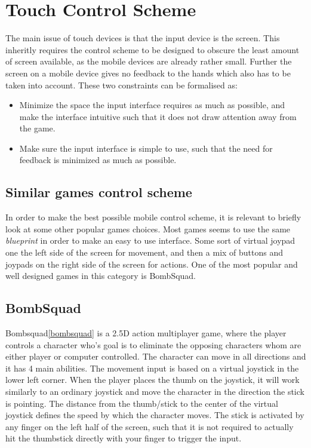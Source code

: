 \section{Touch Control Scheme}
The main issue of touch devices is that the input device is the screen.
This inheritly requires the control scheme to be designed to obscure the least amount of screen available, as the mobile devices are already rather small.
Further the screen on a mobile device gives no feedback to the hands which also has to be taken into account.
These two constraints can be formalised as:
\begin{itemize}
\item Minimize the space the input interface requires as much as possible, and make the interface intuitive such that it does not draw attention away from the game.
\item Make sure the input interface is simple to use, such that the need for feedback is minimized as much as possible.
\end{itemize}

\subsection{Similar games control scheme}
In order to make the best possible mobile control scheme, it is relevant to briefly look at some other popular games choices.
Most games seems to use the same \emph{blueprint} in order to make an easy to use interface. Some sort of virtual joypad one the left side of the screen for movement, and then a mix of buttons and joypads on the right side of the screen for actions. 
One of the most popular and well designed games in this category is BombSquad.

\subsection*{BombSquad}\label{sec:modules:controlscheme:bombsquad}
Bombsquad\ref{bombsquad} is a 2.5D action multiplayer game, where the player controls a character who's goal is to eliminate the opposing characters whom are either player or computer controlled.
The character can move in all directions and it has 4 main abilities. 
The movement input is based on a virtual joystick in the lower left corner.
When the player places the thumb on the joystick, it will work similarly to an ordinary joystick and move the character in the direction the stick is pointing. 
The distance from the thumb/stick to the center of the virtual joystick defines the speed by which the character moves. 
The stick is activated by any finger on the left half of the screen, such that it is not required to actually hit the thumbstick directly with your finger to trigger the input.

